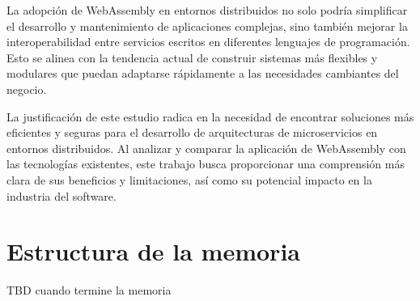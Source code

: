 La adopción de WebAssembly en entornos distribuidos no solo podría simplificar el desarrollo y mantenimiento de aplicaciones complejas, sino también mejorar la interoperabilidad entre servicios escritos en diferentes lenguajes de programación. Esto se alinea con la tendencia actual de construir sistemas más flexibles y modulares que puedan adaptarse rápidamente a las necesidades cambiantes del negocio.

La justificación de este estudio radica en la necesidad de encontrar soluciones más eficientes y seguras para el desarrollo de arquitecturas de microservicios en entornos distribuidos. Al analizar y comparar la aplicación de WebAssembly con las tecnologías existentes, este trabajo busca proporcionar una comprensión más clara de sus beneficios y limitaciones, así como su potencial impacto en la industria del software.

\section{Estructura de la memoria}

TBD cuando termine la memoria